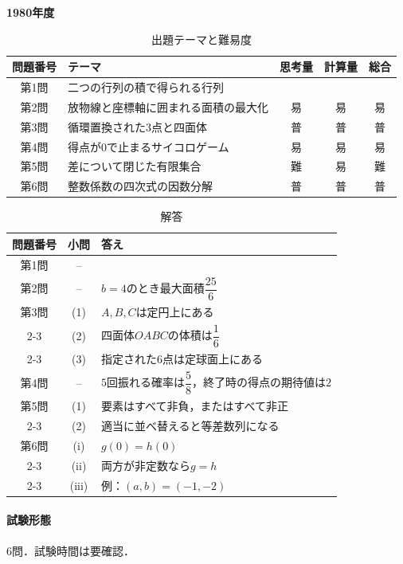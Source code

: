 \documentclass[../../main.tex]{subfiles}
\begin{document}
\begin{center}
  {\fontsize{48pt}{58pt}\selectfont \textbf{1980}\normalsize\textbf{年度}}
\end{center}

\begin{table}[htb]
  \centering
  \caption{出題テーマと難易度}
  \begin{tabular}{|c|p{6.2cm}|c|c|c|}
    \hline
    \textbf{問題番号} & \textbf{テーマ} & \textbf{思考量} & \textbf{計算量} & \textbf{総合} \\
    \hline
    第1問 & 二つの行列の積で得られる行列 &  &  &  \\
    \hline
    第2問 & 放物線と座標軸に囲まれる面積の最大化 & 易 & 易 & 易 \\
    \hline
    第3問 & 循環置換された3点と四面体 & 普 & 普 & 普 \\
    \hline
    第4問 & 得点が0で止まるサイコロゲーム & 易 & 易 & 易 \\
    \hline
    第5問 & 差について閉じた有限集合 & 難 & 易 & 難 \\
    \hline
    第6問 & 整数係数の四次式の因数分解 & 普 & 普 & 普 \\
    \hline
  \end{tabular}
\end{table}

\begin{table}[htb]
  \centering
  \caption{解答}
  \renewcommand{\arraystretch}{1.4}
  \begin{tabular}{|c|c|p{9cm}|}
    \hline
    \textbf{問題番号} & \textbf{小問} & \textbf{答え} \\
    \hline
    第1問 & -- &  \\
    \hline
    第2問 & -- & $b=4$のとき最大面積$\dfrac{25}{6}$ \\
    \hline
    第3問 & (1) & $A,B,C$は定円上にある \\
    \cline{2-3}
    & (2) & 四面体$OABC$の体積は$\dfrac{1}{6}$ \\
    \cline{2-3}
    & (3) & 指定された6点は定球面上にある \\
    \hline
    第4問 & -- & $5$回振れる確率は$\dfrac{5}{8}$，終了時の得点の期待値は$2$ \\
    \hline
    第5問 & (1) & 要素はすべて非負，またはすべて非正 \\
    \cline{2-3}
    & (2) & 適当に並べ替えると等差数列になる \\
    \hline
    第6問 & (i) & $g(0)=h(0)$ \\
    \cline{2-3}
    & (ii) & 両方が非定数なら$g=h$ \\
    \cline{2-3}
    & (iii) & 例：$(a,b)=(-1,-2)$ \\
    \hline
  \end{tabular}
\end{table}

\paragraph{試験形態}
6問．試験時間は要確認．
\end{document}
